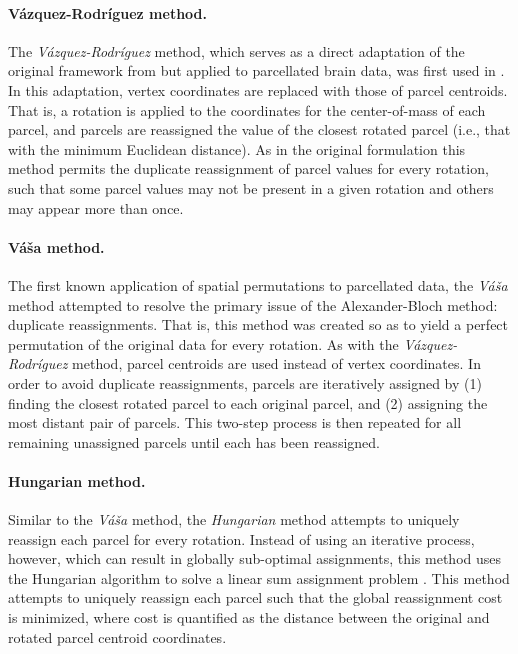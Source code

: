 \documentclass[12pt,aps,pra,reprint,showkeys]{revtex4-1}
\begin{document}
\paragraph*{V{\'a}zquez-Rodr{\'i}guez method.}
The \textit{V{\'a}zquez-Rodr{\'i}guez} method, which serves as a direct adaptation of the original framework from \citet{alexanderbloch2018neuroimage} but applied to parcellated brain data, was first used in \citet{vazquezrodriguez2019pnas}.
In this adaptation, vertex coordinates are replaced with those of parcel centroids.
That is, a rotation is applied to the coordinates for the center-of-mass of each parcel, and parcels are reassigned the value of the closest rotated parcel (i.e., that with the minimum Euclidean distance).
As in the original formulation this method permits the duplicate reassignment of parcel values for every rotation, such that some parcel values may not be present in a given rotation and others may appear more than once.

\paragraph*{V{\'a}{\v{s}}a method.}

The first known application of spatial permutations to parcellated data, the \textit{V{\'a}{\v{s}}a} method \citep{vasa2018cercor} attempted to resolve the primary issue of the Alexander-Bloch method: duplicate reassignments.
That is, this method was created so as to yield a perfect permutation of the original data for every rotation.
As with the \textit{V{\'a}zquez-Rodr{\'i}guez} method, parcel centroids are used instead of vertex coordinates.
In order to avoid duplicate reassignments, parcels are iteratively assigned by (1) finding the closest rotated parcel to each original parcel, and (2) assigning the most distant pair of parcels.
This two-step process is then repeated for all remaining unassigned parcels until each has been reassigned.

\paragraph*{Hungarian method.}

Similar to the \textit{V{\'a}{\v{s}}a} method, the \textit{Hungarian} method attempts to uniquely reassign each parcel for every rotation.
Instead of using an iterative process, however, which can result in globally sub-optimal assignments, this method uses the Hungarian algorithm to solve a linear sum assignment problem \citep{kuhn1955hungarian}.
This method attempts to uniquely reassign each parcel such that the global reassignment cost is minimized, where cost is quantified as the distance between the original and rotated parcel centroid coordinates.
\end{document}
